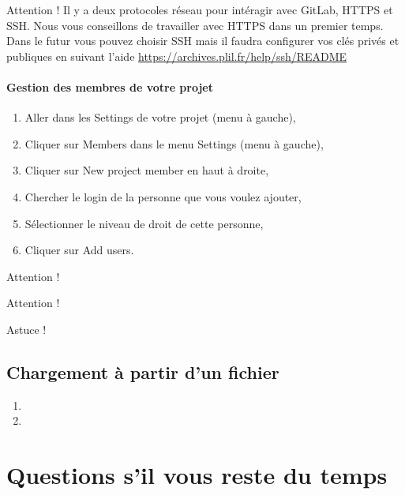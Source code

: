 \documentclass[final, a4paper, openbib, ]{article}
\begin{document}
\begin{alertinfo2}{Attention !}
Il y a deux protocoles réseau pour intéragir avec GitLab, HTTPS et SSH. Nous vous conseillons de travailler avec HTTPS dans un premier temps.
Dans le futur vous pouvez choisir SSH mais il faudra configurer vos clés privés et publiques en suivant l'aide \url{https://archives.plil.fr/help/ssh/README}
\end{alertinfo2}


\paragraph{Gestion des membres de votre projet}
\begin{enumerate}
\item Aller dans les Settings de votre projet (menu à gauche),
\item Cliquer sur Members dans le menu Settings (menu à gauche),
\item Cliquer sur New project member en haut à droite,
\item Chercher le login de la personne que vous voulez ajouter,
\item Sélectionner le niveau de droit de cette personne,
\item Cliquer sur Add users.
\end{enumerate}



\pagebreak

\begin{alertinfo}{Attention !}
\end{alertinfo}
\begin{alertinfo2}{Attention !}
\end{alertinfo2}
\begin{alertinfo3}{Astuce !}
\end{alertinfo3}






\subsection{Chargement à partir d'un fichier}


\begin{enumerate}
\item 
\item 
\end{enumerate}

\section{Questions s’il vous reste du temps}
\end{document}
